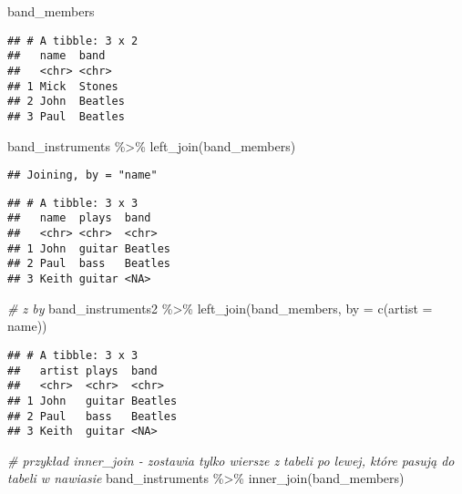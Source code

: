 \documentclass[
]{book}
\newenvironment{Shaded}{\begin{snugshade}}{\end{snugshade}}
\newcommand{\AttributeTok}[1]{\textcolor[rgb]{0.77,0.63,0.00}{#1}}
\newcommand{\CommentTok}[1]{\textcolor[rgb]{0.56,0.35,0.01}{\textit{#1}}}
\newcommand{\FunctionTok}[1]{\textcolor[rgb]{0.00,0.00,0.00}{#1}}
\newcommand{\NormalTok}[1]{#1}
\newcommand{\OtherTok}[1]{\textcolor[rgb]{0.56,0.35,0.01}{#1}}
\newcommand{\SpecialCharTok}[1]{\textcolor[rgb]{0.00,0.00,0.00}{#1}}
\newcommand{\StringTok}[1]{\textcolor[rgb]{0.31,0.60,0.02}{#1}}
\begin{document}
\begin{Shaded}
\begin{Highlighting}[]
\NormalTok{band\_members}
\end{Highlighting}
\end{Shaded}

\begin{verbatim}
## # A tibble: 3 x 2
##   name  band   
##   <chr> <chr>  
## 1 Mick  Stones 
## 2 John  Beatles
## 3 Paul  Beatles
\end{verbatim}

\begin{Shaded}
\begin{Highlighting}[]
\NormalTok{band\_instruments }\SpecialCharTok{\%\textgreater{}\%} \FunctionTok{left\_join}\NormalTok{(band\_members)}
\end{Highlighting}
\end{Shaded}

\begin{verbatim}
## Joining, by = "name"
\end{verbatim}

\begin{verbatim}
## # A tibble: 3 x 3
##   name  plays  band   
##   <chr> <chr>  <chr>  
## 1 John  guitar Beatles
## 2 Paul  bass   Beatles
## 3 Keith guitar <NA>
\end{verbatim}

\begin{Shaded}
\begin{Highlighting}[]
\CommentTok{\# z by}
\NormalTok{band\_instruments2 }\SpecialCharTok{\%\textgreater{}\%} \FunctionTok{left\_join}\NormalTok{(band\_members, }\AttributeTok{by =} \FunctionTok{c}\NormalTok{(}\StringTok{\textquotesingle{}artist\textquotesingle{}} \OtherTok{=} \StringTok{\textquotesingle{}name\textquotesingle{}}\NormalTok{))}
\end{Highlighting}
\end{Shaded}

\begin{verbatim}
## # A tibble: 3 x 3
##   artist plays  band   
##   <chr>  <chr>  <chr>  
## 1 John   guitar Beatles
## 2 Paul   bass   Beatles
## 3 Keith  guitar <NA>
\end{verbatim}

\begin{Shaded}
\begin{Highlighting}[]
\CommentTok{\# przykład inner\_join {-} zostawia tylko wiersze z tabeli po lewej, które pasują do tabeli w nawiasie}
\NormalTok{band\_instruments }\SpecialCharTok{\%\textgreater{}\%} \FunctionTok{inner\_join}\NormalTok{(band\_members)}
\end{Highlighting}
\end{Shaded}
\end{document}

